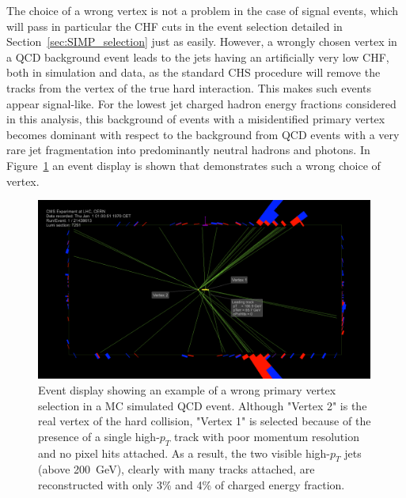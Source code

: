 The choice of a wrong vertex is not a problem in the case of signal events, which will pass in particular the CHF cuts in the event selection detailed in Section~\ref{sec:SIMP_selection} just as easily. However, a wrongly chosen vertex in a \acs{QCD} background event leads to the jets having an artificially very low CHF, both in simulation and data, as the standard \acf{CHS} procedure will remove the tracks from the vertex of the true hard interaction. This makes such events appear signal-like. For the lowest jet charged hadron energy fractions considered in this analysis, this background of events with a misidentified primary vertex becomes dominant with respect to the background from \acs{QCD} events with a very rare jet fragmentation into predominantly neutral hadrons and photons. In Figure~\ref{fig:wrongvertex} an event display is shown that demonstrates such a wrong choice of vertex.

\begin{figure}[ht]
  \centering
  \includegraphics[width=0.99\textwidth]{figures/wrongvertex.png}
  \caption{Event display showing an example of a wrong primary vertex selection in a MC simulated QCD event. Although "Vertex 2" is the real vertex of the hard collision, "Vertex 1" is selected because of the presence of a single high-$p_T$ track with poor momentum resolution and no pixel hits attached. As a result, the two visible high-$p_T$ jets (above \SI{200}{GeV}), clearly with many tracks attached, are reconstructed with only 3\% and 4\% of charged energy fraction.}
  \label{fig:wrongvertex}
\end{figure} 


